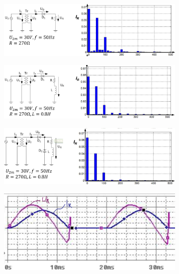 \begin{figure}[h]
	\begin{subfigure}[t]{0.5\linewidth}
		\includegraphics[width=\linewidth]{images/M1UR}
	\end{subfigure}
\begin{subfigure}[t]{0.5\linewidth}
	    \includegraphics[width=\linewidth]{images/M1URL}
\end{subfigure}
\begin{subfigure}[t]{0.5\linewidth}
	    \includegraphics[width=\linewidth]{images/M1URLD}
\end{subfigure}
\begin{subfigure}[t]{0.24\linewidth}
    \includegraphics[width=\linewidth]{images/M1URLKl}

\end{subfigure}
\end{figure}

